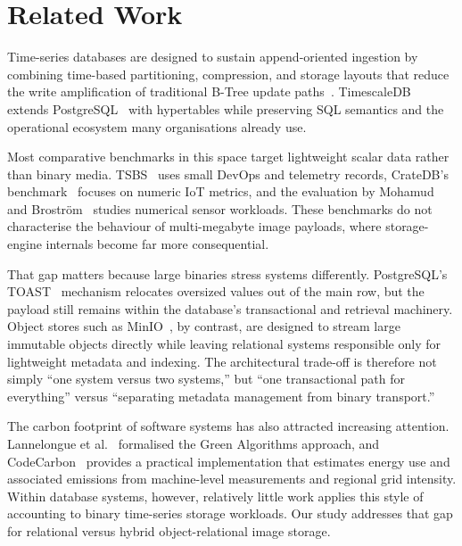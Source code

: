 \documentclass[conference]{IEEEtran}
\begin{document}
\section{Related Work}
\label{sec:related_work}

Time-series databases are designed to sustain append-oriented ingestion by combining time-based partitioning, compression, and storage layouts that reduce the write amplification of traditional B-Tree update paths~\cite{dewaal_timeseries_survey,jensen_tsms_survey}. TimescaleDB~\cite{timescaledb_official} extends PostgreSQL~\cite{postgresql_official} with hypertables while preserving SQL semantics and the operational ecosystem many organisations already use.

Most comparative benchmarks in this space target lightweight scalar data rather than binary media. TSBS~\cite{tsbs} uses small DevOps and telemetry records, CrateDB's benchmark~\cite{cratedb_ts_benchmark} focuses on numeric IoT metrics, and the evaluation by Mohamud and Brostr\"om~\cite{diva_timescaledb_mongodb_eval} studies numerical sensor workloads. These benchmarks do not characterise the behaviour of multi-megabyte image payloads, where storage-engine internals become far more consequential.

That gap matters because large binaries stress systems differently. PostgreSQL's TOAST~\cite{postgresql_toast_docs} mechanism relocates oversized values out of the main row, but the payload still remains within the database's transactional and retrieval machinery. Object stores such as MinIO~\cite{minio_official}, by contrast, are designed to stream large immutable objects directly while leaving relational systems responsible only for lightweight metadata and indexing. The architectural trade-off is therefore not simply ``one system versus two systems,'' but ``one transactional path for everything'' versus ``separating metadata management from binary transport.''

The carbon footprint of software systems has also attracted increasing attention. Lannelongue et al.~\cite{lannelongue_green_algorithms} formalised the Green Algorithms approach, and CodeCarbon~\cite{codecarbon} provides a practical implementation that estimates energy use and associated emissions from machine-level measurements and regional grid intensity. Within database systems, however, relatively little work applies this style of accounting to binary time-series storage workloads. Our study addresses that gap for relational versus hybrid object-relational image storage.
\end{document}
